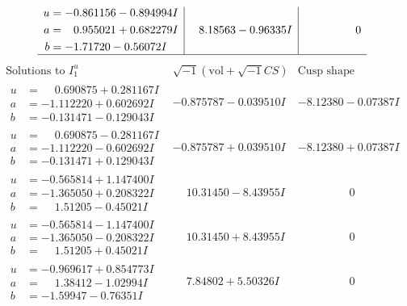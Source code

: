 \documentclass[1p]{elsarticle_modified}
\theoremstyle{definition}
\newcommand{\I}{\sqrt{-1}}
\begin{document}
$$\begin{array}{c|c|c}
\begin{aligned}
u &= -0.861156 - 0.894994 I \\
a &= \phantom{-}0.955021 + 0.682279 I \\
b &= -1.71720 - 0.56072 I\end{aligned}
 & \phantom{-}8.18563 - 0.96335 I & \phantom{-0.000000 } 0\\
 \hline 
 \end{array}$$\newpage$$\begin{array}{c|c|c}  
\text{Solutions to }I^u_{1}& \I (\text{vol} + \sqrt{-1}CS) & \text{Cusp shape}\\
 \hline 
\begin{aligned}
u &= \phantom{-}0.690875 + 0.281167 I \\
a &= -1.112220 + 0.602692 I \\
b &= -0.131471 - 0.129043 I\end{aligned}
 & -0.875787 - 0.039510 I & -8.12380 - 0.07387 I \\ \hline\begin{aligned}
u &= \phantom{-}0.690875 - 0.281167 I \\
a &= -1.112220 - 0.602692 I \\
b &= -0.131471 + 0.129043 I\end{aligned}
 & -0.875787 + 0.039510 I & -8.12380 + 0.07387 I \\ \hline\begin{aligned}
u &= -0.565814 + 1.147400 I \\
a &= -1.365050 + 0.208322 I \\
b &= \phantom{-}1.51205 - 0.45021 I\end{aligned}
 & \phantom{-}10.31450 - 8.43955 I & \phantom{-0.000000 } 0 \\ \hline\begin{aligned}
u &= -0.565814 - 1.147400 I \\
a &= -1.365050 - 0.208322 I \\
b &= \phantom{-}1.51205 + 0.45021 I\end{aligned}
 & \phantom{-}10.31450 + 8.43955 I & \phantom{-0.000000 } 0 \\ \hline\begin{aligned}
u &= -0.969617 + 0.854773 I \\
a &= \phantom{-}1.38412 - 1.02994 I \\
b &= -1.59947 - 0.76351 I\end{aligned}
 & \phantom{-}7.84802 + 5.50326 I & \phantom{-0.000000 } 0 \\ \hline\begin{aligned}

\end{aligned}
\end{array}$$
\end{document}
